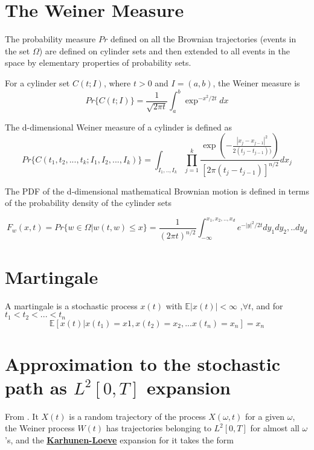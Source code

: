 \documentclass[12pt]{book}
\begin{document}
\section{The Weiner Measure}\label{section:theWeinerMeasure}
The probability measure $Pr$ defined on all the Brownian trajectories (events in the set $\Omega$) are defined on cylinder sets and then extended to all events in the space by elementary properties of probability sets.

For a cylinder set $C(t;I)$, where $t>0$ and $I=(a,b)$, the Weiner measure is 
\begin{equation*}
Pr\{C(t;I)\}=\frac{1}{\sqrt{2\pi t}}\int_a^b\exp^{-x^2/2t}dx
\end{equation*}

The d-dimensional Weiner measure of a cylinder is defined as 
\begin{equation*}
Pr\{C(t_1,t_2,...,t_k;I_1,I_2,...,I_k)\} = \int_{I_1,..,I_k}\prod_{j=1}^k\frac{\exp\left(-\frac{|x_j-x_{j-1}|^2} {2(t_j-t_{j-1}))}\right)}{[2\pi(t_j-t_{j-1})]^{n/2}}dx_j
\end{equation*}

The PDF of the d-dimensional mathematical Brownian motion is defined in terms of the probability density of the cylinder sets

\begin{equation*}
F_w(x,t)=Pr\{w\in \Omega |w(t,w)\leq x\}=\frac{1}{(2\pi t)^{n/2}}\int_{-\infty}^{x_1,x_2,..,x_d}e^{-|y|^2 /2t}dy_1dy_2,..dy_d
\end{equation*}

\section{Martingale}\label{section:martingale}
A martingale is a stochastic process $ x(t)$ with $\mathbb{E}|x(t)|<\infty$ ,$\forall t$, and for $t_1<t_2<...<t_n$
\begin{equation*}
\mathbb{E}[x(t)|x(t_1)=x1,x(t_2)=x_2,...x(t_n)=x_n]=x_n
\end{equation*}

\section{Approximation to the stochastic path as $L^2[0,T]$ expansion}
From \cite{iacus2009simulation}. It $X(t)$ is a random trajectory of the process $X(\omega, t)$ for a given $\omega$, the Weiner process $W(t)$ has trajectories belonging to $L^2[0,T]$ for almost all $\omega$'s, and the \textbf{\href{http://en.wikipedia.org/wiki/Karhunen-Loeve_theorem}{Karhunen-Loeve}} expansion for it takes the form 
\end{document}
